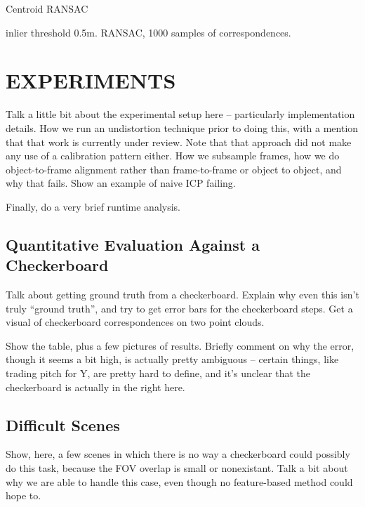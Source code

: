 \documentclass[letterpaper, 10 pt, conference]{ieeeconf}  %
\begin{document}
\begin{algorithm}
  \caption{Centroid RANSAC}
  \label{alg:cal}
  \SetLine
  \phantom{\;}
  inlier threshold 0.5m.  RANSAC, 1000 samples of correspondences.
\end{algorithm}



\section{EXPERIMENTS}

Talk a little bit about the experimental setup here -- particularly implementation details. How we run an undistortion technique 
prior to doing this, with a mention that that work is currently under review. Note that that approach did not make any use of a 
calibration pattern either. How we subsample frames, 
how we do object-to-frame alignment rather than frame-to-frame or object to object, and why that fails. Show an example of naive ICP failing.

Finally, do a very brief runtime analysis.

\subsection{Quantitative Evaluation Against a Checkerboard}

Talk about getting ground truth from a checkerboard. Explain why even this isn't truly ``ground truth'', and try to get error bars 
for the checkerboard steps. Get a visual of checkerboard correspondences on two point clouds.

Show the table, plus a few pictures of results. Briefly comment on why the error, though it seems a bit high, is actually pretty ambiguous -- certain things, like trading pitch for Y, are pretty hard to define, and it's unclear that the checkerboard is actually in the 
right here. 

\subsection{Difficult Scenes}

Show, here, a few scenes in which there is no way a checkerboard could possibly do this task, because the FOV overlap is small or 
nonexistant. Talk a bit about why we are able to handle this case, even though no feature-based method could hope to.
\end{document}
